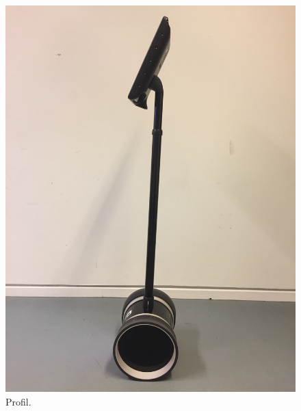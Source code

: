 \begin{figure}[H]
\begin{minipage}{.33\textwidth}
  \includegraphics[width=\linewidth, angle =-90]{Figure/ModificeretDoubleSide}
  \caption{Profil.}
  \label{fig:ModificeretDoubleSide}
\end{minipage}
\begin{minipage}{.33\textwidth}
  \centering

\end{minipage}
\end{figure}
